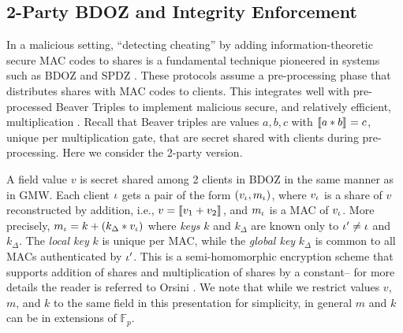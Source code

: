 \subsection{2-Party BDOZ and Integrity Enforcement}
\label{section-example-bdoz}



In a malicious setting, ``detecting cheating'' by adding
information-theoretic secure MAC codes to shares is a fundamental
technique pioneered in systems such as BDOZ and SPDZ
\cite{SPDZ1,SPDZ2,BDOZ,10.1007/978-3-030-68869-1_3}.  These protocols
assume a pre-processing phase that distributes shares with MAC codes
to clients.  This integrates well with pre-processed Beaver Triples to
implement malicious secure, and relatively efficient, multiplication
\cite{evans2018pragmatic}. Recall that Beaver triples are values $a,b,c$ with
$\llbracket a * b \rrbracket_{} = c$, unique per multiplication gate, that are secret
shared with clients during pre-processing. Here we consider the
2-party version.

A field value $v$ is secret shared among 2 clients in BDOZ in the same
manner as in GMW.  Each client $\iota$ gets a pair of the form
$(v_\iota,m_\iota)$, where $v_\iota$ is a share of $v$ reconstructed by
addition, i.e., $v = \llbracket v_1 + v_2 \rrbracket_{}$, and $m_\iota$ is a MAC of
$v_\iota$.  More precisely, $m_\iota = k + (k_\Delta * v_\iota)$ where
\emph{keys} $k$ and $k_\Delta$ are known only to $\iota' \ne \iota$ and
$k_\Delta$. The \emph{local key} $k$ is unique per MAC, while the
\emph{global key} $k_\Delta$ is common to all MACs authenticated by
$\iota'$. This is a semi-homomorphic encryption scheme that supports
addition of shares and multiplication of shares by a constant-- for
more details the reader is referred to Orsini
\cite{10.1007/978-3-030-68869-1_3}. We note that while we restrict
values $v$, $m$, and $k$ to the same field in this presentation for
simplicity, in general $m$ and $k$ can be in extensions of
$\mathbb{F}_p$.

